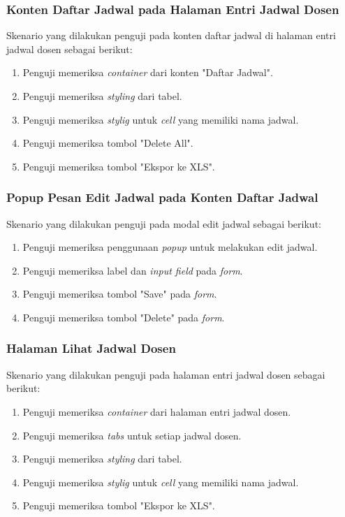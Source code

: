\subsubsection{Konten Daftar Jadwal pada Halaman Entri Jadwal Dosen}
Skenario yang dilakukan penguji pada konten daftar jadwal di halaman entri jadwal dosen sebagai berikut:
\begin{enumerate}
	\item Penguji memeriksa \textit{container} dari konten "Daftar Jadwal".
	\item Penguji memeriksa \textit{styling} dari tabel.	
	\item Penguji memeriksa \textit{stylig} untuk \textit{cell} yang memiliki nama jadwal.			
	\item Penguji memeriksa tombol "Delete All".
	\item Penguji memeriksa tombol "Ekspor ke XLS".
\end{enumerate}

\subsubsection{Popup Pesan Edit Jadwal pada Konten Daftar Jadwal}
Skenario yang dilakukan penguji pada modal edit jadwal sebagai berikut:
\begin{enumerate}
	\item Penguji memeriksa penggunaan \textit{popup} untuk melakukan edit jadwal.
	\item Penguji memeriksa label dan \textit{input field} pada \textit{form}. 
	\item Penguji memeriksa tombol "Save" pada \textit{form}.
	\item Penguji memeriksa tombol "Delete" pada \textit{form}.
\end{enumerate}

\subsubsection{Halaman Lihat Jadwal Dosen}
Skenario yang dilakukan penguji pada halaman entri jadwal dosen sebagai berikut:
\begin{enumerate}
	\item Penguji memeriksa \textit{container} dari halaman entri jadwal dosen.
	\item Penguji memeriksa \textit{tabs} untuk setiap jadwal dosen.
	\item Penguji memeriksa \textit{styling} dari tabel.	
	\item Penguji memeriksa \textit{stylig} untuk \textit{cell} yang memiliki nama jadwal.
	\item Penguji memeriksa tombol "Ekspor ke XLS".
\end{enumerate}


